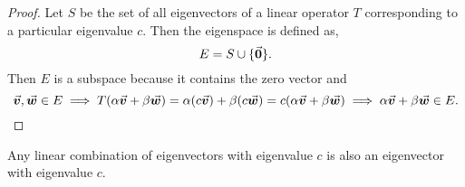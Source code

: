 \documentclass[../MathsNotesBase.tex]{subfiles}
\begin{document}
{	 	\bigskip
	 	\begin{proof}
	 		Let $S$ be the set of all eigenvectors of a linear operator $T$ corresponding to a particular eigenvalue $c$. Then the eigenspace is defined as,
	 		\[ E = S \cup \{\vec{\bm{0}}\}. \]
	 		Then $E$ is a subspace because it contains the zero vector and
	 		\[ \vec{\bm{v}},\vec{\bm{w}} \in E \implies T(\alpha\vec{\bm{v}} + \beta\vec{\bm{w}}) = \alpha(c\vec{\bm{v}}) + \beta(c\vec{\bm{w}}) = c(\alpha\vec{\bm{v}} + \beta\vec{\bm{w}}) \implies \alpha\vec{\bm{v}} + \beta\vec{\bm{w}} \in E. \qedhere \]
	 	\end{proof}
 		\begin{corollary}
 			Any linear combination of eigenvectors with eigenvalue $c$ is also an eigenvector with eigenvalue $c$.
 		\end{corollary}
 	

}
\end{document}
